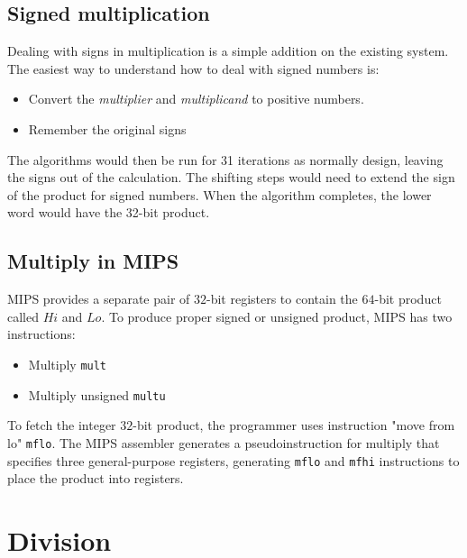 \documentclass[10pt,a4paper]{article}
\begin{document}
\subsection{Signed multiplication}

Dealing with signs in multiplication is a simple addition on the existing system. The easiest way to
understand how to deal with signed numbers is:
\begin{itemize}
    \item Convert the \textit{multiplier} and \textit{multiplicand} to positive numbers.
    \item Remember the original signs
\end{itemize}  

The algorithms would then be run for 31 iterations as normally design, leaving the signs out of the
calculation. The shifting steps would need to extend the sign of the product for signed numbers.
When the algorithm completes, the lower word would have the 32-bit product.

\subsection{Multiply in MIPS}

MIPS provides a separate pair of $32$-bit registers to contain the $64$-bit product called $Hi$ and
$Lo$. To produce proper signed or unsigned product, MIPS has two instructions: 
\begin{itemize}
    \item Multiply \texttt{mult}
    \item Multiply unsigned \texttt{multu}
\end{itemize} 

To fetch the integer $32$-bit product, the programmer uses instruction "move from lo" \texttt{mflo}.
The MIPS assembler generates a pseudoinstruction for multiply that specifies three general-purpose
registers, generating \texttt{mflo} and \texttt{mfhi} instructions to place the product into registers.

\pagebreak

\section{Division}
\end{document}
